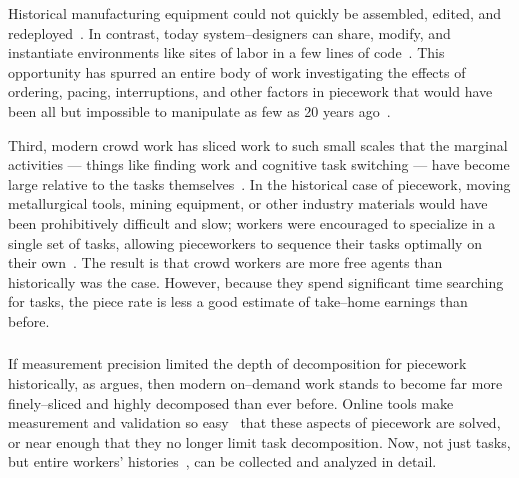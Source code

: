 \documentclass[trackingWork]{subfiles}
\begin{document}
Historical manufacturing equipment could not quickly be assembled,
edited,
and redeployed~\cite{hu1961parallel}.
In contrast,
today system--designers can share,
modify,
and instantiate environments
like sites of labor in a few lines of code~\cite{lessig2006code,turkitLittle}.
This opportunity has spurred an entire body of work investigating the effects of
ordering,
pacing,
interruptions,
and
other factors in piecework that would have been
all but impossible to manipulate as few as 20 years ago~\cite{dai2015and,
                                                              Cai:2016:CRI:2858036.2858237,
                                                              cheng2015break,
                                                              measuringCrowdsourcingCheng,
                                                              embracingErrorKrishna}.
 
Third,
modern crowd work has sliced work to such small scales that the marginal activities
--- things like finding work and cognitive task switching ---
have become large relative to the tasks themselves~\cite{taskSearch}.
In the historical case of piecework,
moving metallurgical tools,
mining equipment,
or
other industry materials would have been prohibitively difficult and slow;
workers were encouraged to specialize in a single set of tasks,
allowing pieceworkers to sequence their tasks optimally on their own~\cite{hart2013rise}.
The result is that crowd workers are more free agents than historically was the case.
However,
because they spend significant time searching for tasks,
the piece rate is less a good estimate of take--home earnings than before.


\subsubsection{\implication}
If measurement precision limited the depth of decomposition for piecework historically,
as \citeauthor{10.2307/23702539} argues,
then modern on--demand work stands to become far more finely--sliced and highly decomposed than ever before.
Online tools make measurement and validation so easy~\cite{rzeszotarski2011instrumenting} that these aspects of piecework are solved,
or near enough that they no longer limit task decomposition.
Now,
not just tasks,
but entire workers' histories~\cite{hata2017glimpse},
can be collected and analyzed in detail.
\end{document}

